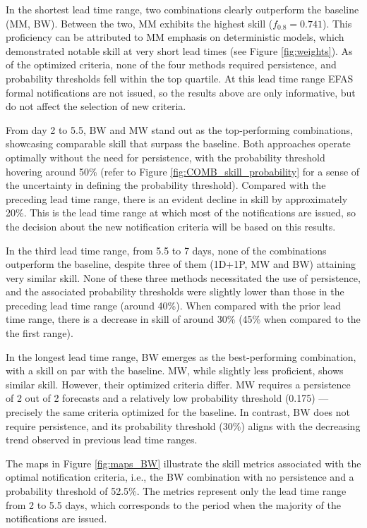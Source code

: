 \documentclass[preprint,12pt,authoryear]{elsarticle}
\begin{document}
In the shortest lead time range, two combinations clearly outperform the baseline (MM, BW). Between the two, MM exhibits the highest skill ($f_{0.8}=0.741$). This proficiency can be attributed to MM emphasis on deterministic models, which demonstrated notable skill at very short lead times (see Figure \ref{fig:weights}). As of the optimized criteria, none of the four methods required persistence, and probability thresholds fell within the top quartile. At this lead time range EFAS formal notifications are not issued, so the results above are only informative, but do not affect the selection of new criteria.

From day 2 to 5.5, BW and MW stand out as the top-performing combinations, showcasing comparable skill that surpass the baseline. Both approaches operate optimally without the need for persistence, with the probability threshold hovering around 50\% (refer to Figure \ref{fig:COMB_skill_probability} for a sense of the uncertainty in defining the probability threshold). Compared with the preceding lead time range, there is an evident decline in skill by approximately 20\%. This is the lead time range at which most of the notifications are issued, so the decision about the new notification criteria will be based on this results.

In the third lead time range, from 5.5 to 7 days, none of the combinations outperform the baseline, despite three of them (1D+1P, MW and BW) attaining very similar skill. None of these three methods necessitated the use of persistence, and the associated probability thresholds were slightly lower than those in the preceding lead time range (around 40\%). When compared with the prior lead time range, there is a decrease in skill of around 30\% (45\% when compared to the the first range).

In the longest lead time range, BW emerges as the best-performing combination, with a skill on par with the baseline. MW, while slightly less proficient, shows similar skill. However, their optimized criteria differ. MW requires a persistence of 2 out of 2 forecasts and a relatively low probability threshold (0.175) — precisely the same criteria optimized for the baseline. In contrast, BW does not require persistence, and its probability threshold (30\%) aligns with the decreasing trend observed in previous lead time ranges.

The maps in Figure \ref{fig:maps_BW} illustrate the skill metrics associated with the optimal notification criteria, i.e., the BW combination with no persistence and a probability threshold of 52.5\%. The metrics represent only the lead time range from 2 to 5.5 days, which corresponds to the period when the majority of the notifications are issued. 
\end{document}
